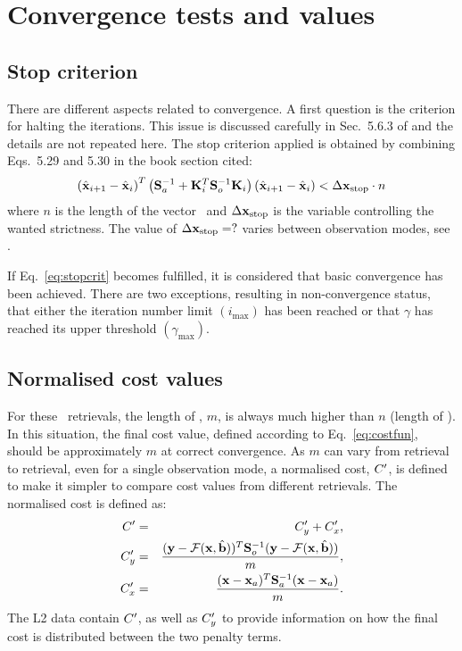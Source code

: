 \section{Convergence tests and values}
\label{sec:conv}
%
\subsection{Stop criterion}
There are different aspects related to convergence. A first question is the
criterion for halting the iterations. This issue is discussed carefully in
Sec.~5.6.3 of \citet{rodgers:00} and the details are not repeated here. The
stop criterion applied is obtained by combining Eqs.~5.29 and 5.30 in the
book section cited:
\begin{equation}
  \label{eq:stopcrit}
  \left( \hat{\mathbf{x}}_{i+1} - \hat{\mathbf{x}}_i \right)^T
  \left( \mathbf{S}_{a}^{-1} + 
         \mathbf{K}_{i}^T\mathbf{S}_{o}^{-1}\mathbf{K}_{i} \right)
  \left( \hat{\mathbf{x}}_{i+1} - \hat{\mathbf{x}}_i \right) < \Delta\mathbf{x}_\mathrm{stop} \cdot n
\end{equation}
where $n$ is the length of the vector \SttVct\ and
$\Delta\mathbf{x}_\mathrm{stop}$ is the variable controlling the wanted
strictness. The value of $\Delta\mathbf{x}_\mathrm{stop}=?$ varies between
observation modes, see \citet{atbdl2data}.

If Eq.~\ref{eq:stopcrit} becomes fulfilled, it is considered that basic
convergence has been achieved. There are two exceptions, resulting in
non-convergence status, that either the iteration number limit
$(i_\mathrm{max})$ has been reached or that $\gamma$ has reached its upper
threshold $(\gamma_\mathrm{max})$.


\subsection{Normalised cost values}
%
For these \smr\ retrievals, the length of \MsrVct, $m$, is always much higher
than $n$ (length of \SttVct). In this situation, the final cost value, defined
according to Eq.~\ref{eq:costfun}, should be approximately $m$ at correct
convergence. As $m$ can vary from retrieval to retrieval, even for a single
observation mode, a normalised cost, $C'$, is defined to make it simpler to
compare cost values from different retrievals. The normalised cost is
defined as:
\begin{eqnarray}
  \label{eq:scaledc}
  C' &=& C_y' + C_x', \\
  C_y' &=& \frac{(\mathbf{y}-\mathcal{F}(\mathbf{x},\hat{\mathbf{b}}))^T\mathbf{S}_{o}^{-1}
  (\mathbf{y}-\mathcal{F}(\mathbf{x},\hat{\mathbf{b}}))}{m},\\
  C_x' &=& \frac{(\mathbf{x}-\mathbf{x}_{a})^T\mathbf{S}_{a}^{-1}(\mathbf{x}-\mathbf{x}_{a})}{m}.\\
\end{eqnarray}
The L2 data contain $C'$, as well as $C_y'$ to provide information
on how the final cost is distributed between the two penalty terms.


